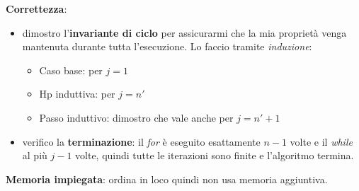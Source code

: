 \textbf{Correttezza}:
\begin{itemize}
	\item dimostro l'\textbf{invariante di ciclo} per assicurarmi che la mia proprietà venga mantenuta durante tutta l'esecuzione. Lo faccio tramite \emph{induzione}:
	\begin{itemize}
		\item Caso base: per $j=1$
		\item Hp induttiva: per $j=n'$
		\item Passo induttivo: dimostro che vale anche per $j=n'+1$
	\end{itemize}
	\item verifico la \textbf{terminazione}: il \emph{for} è eseguito esattamente $n-1$ volte e il \emph{while} al più $j-1$ volte, quindi tutte le iterazioni sono finite e l'algoritmo termina.
\end{itemize}
\textbf{Memoria impiegata}: ordina in loco quindi non usa memoria aggiuntiva.


